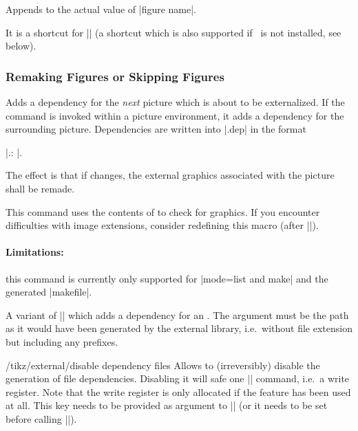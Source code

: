 {\begin{command}{\tikzappendtofigurename{}}
	Appends  to the actual value of |figure name|.

	It is a shortcut for || (a shortcut which is also supported if \tikzname\ is not installed, see below).
\end{command}


\subsubsection{Remaking Figures or Skipping Figures}
\begin{command}{\tikzpicturedependsonfile{}}
	Adds a dependency for the \emph{next} picture which is about to be externalized. If the command is invoked within a picture environment, it adds a dependency for the surrounding picture. Dependencies are written into |.dep| in the format
	
	|.\tikzexternalimgextension: |.

	The effect is that if  changes, the external graphics associated with the picture shall be remade.

	This command uses the contents of \declareandlabel{\tikzexternalimgextension} to check for graphics. If you encounter difficulties with image extensions, consider redefining this macro (after |\tikzexternalize|).

	\paragraph{Limitations:} this command is currently only supported for |mode=list and make| and the generated |makefile|.
\end{command}
\begin{command}{\tikzexternalfiledependsonfile{}}
	A variant of |\tikzpicturedependsonfile| which adds a dependency for an . The argument  must be the path as it would have been generated by the external library, i.e.\ without file extension but including any prefixes.
\end{command}
\begin{key}{/tikz/external/disable dependency files}
	Allows to (irreversibly) disable the generation of file dependencies. Disabling it will safe one |\newwrite| command, i.e.\ a write register. Note that the write register is only allocated if the feature has been used at all. This key needs to be provided as argument to |\tikzexternalize| (or it needs to be set before calling |\tikzexternalize|).


\end{key}}
